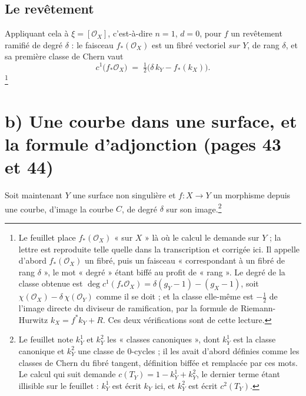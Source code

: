 \documentclass[11pt,a4paper]{article}
\begin{document}
\subsection*{Le revêtement}

Appliquant cela à $\xi = [\mathcal{O}_{X}]$, c'est-à-dire $n = 1$, $d = 0$,
pour $f$ un revêtement ramifié de degré $\delta$ : le faisceau $f_{*}(\mathcal{O}_{X})$
est un fibré vectoriel \emph{sur $Y$}, de rang $\delta$, et sa première classe
de Chern vaut
\[
  c^{1}\bigl(f_{*}\mathcal{O}_{X}\bigr)
  \;=\; \tfrac{1}{2}\bigl(\delta\,k_{Y} - f_{*}(k_{X})\bigr).
\]
\footnote{Le feuillet place $f_{*}(\mathcal{O}_{X})$ « sur $X$ » là où le calcul
le demande sur $Y$ ; la lettre est reproduite telle quelle dans la
transcription et corrigée ici. Il appelle d'abord $f_{*}(\mathcal{O}_{X})$ un
fibré, puis un faisceau « correspondant à un fibré de rang $\delta$ », le mot
« degré » étant biffé au profit de « rang ». Le degré de la classe obtenue est
$\deg c^{1}(f_{*}\mathcal{O}_{X}) = \delta(g_{Y}-1) - (g_{X}-1)$, soit
$\chi(\mathcal{O}_{X}) - \delta\,\chi(\mathcal{O}_{Y})$ comme il se doit ; et
la classe elle-même est $-\tfrac12$ de l'image directe du diviseur de
ramification, par la formule de Riemann-Hurwitz $k_{X} = f^{*}k_{Y} + R$. Ces
deux vérifications sont de cette lecture.}

\section*{b) Une courbe dans une surface, et la formule d'adjonction (pages 43 et 44)}

Soit maintenant $Y$ une surface non singulière et $f : X \to Y$ un morphisme
depuis une courbe, d'image la courbe $C$, de degré $\delta$ sur son
image.\footnote{Le feuillet note $k_{Y}^{1}$ et $k_{Y}^{2}$ les « classes
canoniques », dont $k_{Y}^{1}$ est la classe canonique et $k_{Y}^{2}$ une classe
de $0$-cycles ; il les avait d'abord définies comme les classes de Chern du
fibré tangent, définition biffée et remplacée par ces mots. Le calcul qui suit
demande $c(T_{Y}) = 1 - k_{Y}^{1} + k_{Y}^{2}$, le dernier terme étant
illisible sur le feuillet : $k_{Y}^{1}$ est écrit $k_{Y}$ ici, et $k_{Y}^{2}$
est écrit $c^{2}(T_{Y})$.}
\end{document}
